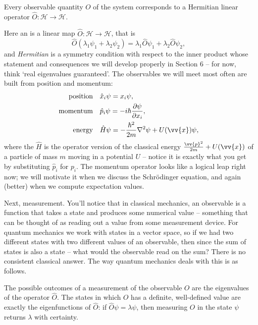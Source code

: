 \begin{axiom}[Observables]
    Every observable quantity $O$ of the system corresponds to a Hermitian linear operator $\hat{O}: \mathcal{H} \rightarrow \mathcal{H}$.
\end{axiom}

Here an  is a linear map $\hat{O} : \mathcal{H} \to \mathcal{H}$, that is
$$
\hat{O}(\lambda_1 \psi_1 + \lambda_2 \psi_2) = \lambda_1 \hat{O} \psi_1 + \lambda_2 \hat{O} \psi_2,
$$
and \emph{Hermitian} is a symmetry condition with respect to the inner product whose statement and consequences we will develop properly in Section 6 -- for now, think `real eigenvalues guaranteed'. The observables we will meet most often are built from position and momentum:
\begin{align*}
    \text{position} \quad & \hat{x}_i \psi = x_i \psi, \\
    \text{momentum} \quad & \hat{p}_i \psi = -i \hbar \frac{\partial \psi}{\partial x_i}, \\
    \text{energy} \quad & \hat{H} \psi = -\frac{\hbar^2}{2m} \nabla^2 \psi + U(\vv{x}) \psi,
\end{align*}
where the  $\hat{H}$ is the operator version of the classical energy $\frac{\vv{p}^2}{2m} + U(\vv{x})$ of a particle of mass $m$ moving in a potential $U$ -- notice it is exactly what you get by substituting $\hat{p}_i$ for $p_i$. The momentum operator looks like a logical leap right now; we will motivate it when we discuss the Schr\"odinger equation, and again (better) when we compute expectation values.

Next, measurement. You'll notice that in classical mechanics, an observable is a function that takes a state and produces some numerical value -- something that can be thought of as reading out a value from some measurement device. For quantum mechanics we work with states in a vector space, so if we had two different states with two different values of an observable, then since the sum of states is also a state -- what would the observable read on the sum? There is no consistent classical answer. The way quantum mechanics deals with this is as follows.

\begin{axiom}[Measurement]
    The possible outcomes of a measurement of the observable $O$ are the eigenvalues of the operator $\hat{O}$. The states in which $O$ has a definite, well-defined value are exactly the eigenfunctions of $\hat{O}$: if $\hat{O} \psi = \lambda \psi$, then measuring $O$ in the state $\psi$ returns $\lambda$ with certainty.
\end{axiom}

